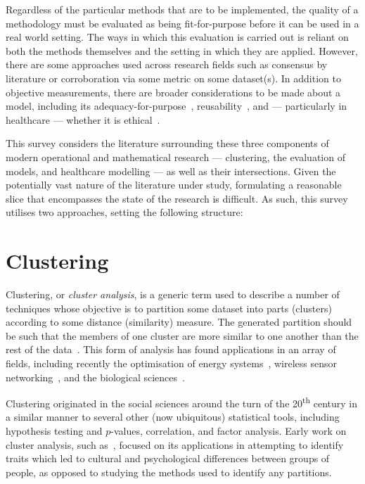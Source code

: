 Regardless of the particular methods that are to be implemented, the quality of
a methodology must be evaluated as being fit-for-purpose before it can be used
in a real world setting. The ways in which this evaluation is carried out is
reliant on both the methods themselves and the setting in which they are
applied. However, there are some approaches used across research fields such as
consensus by literature or corroboration via some metric on some dataset(s). In
addition to objective measurements, there are broader considerations to be made
about a model, including its adequacy-for-purpose~\cite{Parker2020},
reusability~\cite{Robinson2004}, and --- particularly in healthcare --- whether
it is ethical~\cite{Grote2020}.

This survey considers the literature surrounding these three components of
modern operational and mathematical research --- clustering, the evaluation of
models, and healthcare modelling --- as well as their intersections. Given the
potentially vast nature of the literature under study, formulating a reasonable
slice that encompasses the state of the research is difficult. As such, this
survey utilises two approaches, setting the following structure:



\section{Clustering}\label{sec:clustering}
\graphicspath{{chapters/lit/paper/img/clusters/}}

Clustering, or \emph{cluster analysis}, is a generic term used to describe a
number of techniques whose objective is to partition some dataset into parts
(clusters) according to some distance (similarity) measure. The generated
partition should be such that the members of one cluster are more similar to one
another than the rest of the data~\cite{Everitt2011}. This form of analysis has
found applications in an array of fields, including recently the optimisation
of energy systems~\cite{Jing2019,Teichgraeber2019}, wireless sensor
networking~\cite{Goswami2019}, and the biological
sciences~\cite{Bulut2020,Kiselev2019}.

Clustering originated in the social sciences around the turn of the
20\textsuperscript{th} century in a similar manner to several other (now
ubiquitous) statistical tools, including hypothesis testing and \(p\)-values,
correlation, and factor analysis. Early work on cluster analysis, such
as~\cite{Cattell1943,Driver1932}, focused on its applications in attempting to
identify traits which led to cultural and psychological differences between
groups of people, as opposed to studying the methods used to identify any
partitions.

